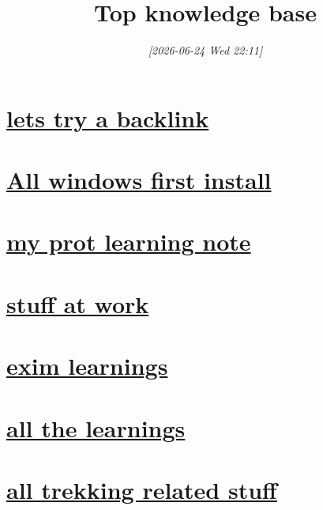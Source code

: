 \documentclass[11pt]{article}
\date{\textit{{[}2026-06-24 Wed 22:11]}}
\title{Top knowledge base}
\begin{document}
\maketitle
\tableofcontents

\section{\href{c:/Users/LENOVO/Vip-emacs/Projects/github/org-denote-blog-forge/notes/20260624T224315--lets-try-a-backlink\_\_emacs.org}{lets try a backlink}}
\label{sec:orga406a36}
\section{\href{c:/Users/LENOVO/Vip-emacs/Projects/github/org-denote-blog-forge/notes/20260624T230321--all-windows-first-install\_\_first\_install\_setup\_windows.org}{All windows first install}}
\label{sec:orgbbf3ff1}
\section{\href{c:/Users/LENOVO/Vip-emacs/Projects/github/org-denote-blog-forge/notes/20260625T075258--my-prot-learning-note\_\_learning\_test.org}{my prot learning note}}
\label{sec:org2eda6ad}
\section{\href{c:/Users/LENOVO/Vip-emacs/Projects/github/org-denote-blog-forge/notes/20260630T084756--stuff-at-work\_\_learning\_stuff\_work.org}{stuff at work}}
\label{sec:orgadd21f9}
\section{\href{c:/Users/LENOVO/Vip-emacs/Projects/github/org-denote-blog-forge/notes/20260630T215114--exim-learnings\_\_exim\_learning.org}{exim learnings}}
\label{sec:org1d2412d}
\section{\href{c:/Users/LENOVO/Vip-emacs/Projects/github/org-denote-blog-forge/notes/20260708T083322--all-the-learnings\_\_knowledge\_learning\_youtube.org}{all the learnings}}
\label{sec:org4195d1e}
\subsection{}
\label{sec:org1eeb1d1}
\section{\href{c:/Users/LENOVO/Vip-emacs/Projects/github/org-denote-blog-forge/notes/20260712T083907--all-trekking-related-stuff\_\_data\_trekking.org}{all trekking related stuff}}
\label{sec:org084cf30}
\end{document}
